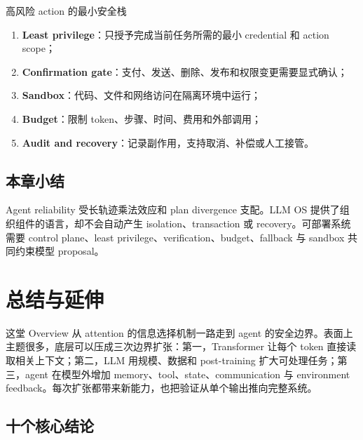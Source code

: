 \documentclass[a4paper]{article}
\begin{document}
\begin{importantbox}{高风险 action 的最小安全栈}
\begin{enumerate}
  \item \textbf{Least privilege}：只授予完成当前任务所需的最小 credential 和 action scope；
  \item \textbf{Confirmation gate}：支付、发送、删除、发布和权限变更需要显式确认；
  \item \textbf{Sandbox}：代码、文件和网络访问在隔离环境中运行；
  \item \textbf{Budget}：限制 token、步骤、时间、费用和外部调用；
  \item \textbf{Audit and recovery}：记录副作用，支持取消、补偿或人工接管。
\end{enumerate}
\end{importantbox}


\subsection{本章小结}

Agent reliability 受长轨迹乘法效应和 plan divergence 支配。LLM OS 提供了组织组件的语言，却不会自动产生 isolation、transaction 或 recovery。可部署系统需要 control plane、least privilege、verification、budget、fallback 与 sandbox 共同约束模型 proposal。

\section{总结与延伸}

这堂 Overview 从 attention 的信息选择机制一路走到 agent 的安全边界。表面上主题很多，底层可以压成三次边界扩张：第一，Transformer 让每个 token 直接读取相关上下文；第二，LLM 用规模、数据和 post-training 扩大可处理任务；第三，agent 在模型外增加 memory、tool、state、communication 与 environment feedback。每次扩张都带来新能力，也把验证从单个输出推向完整系统。

\subsection{十个核心结论}
\end{document}
